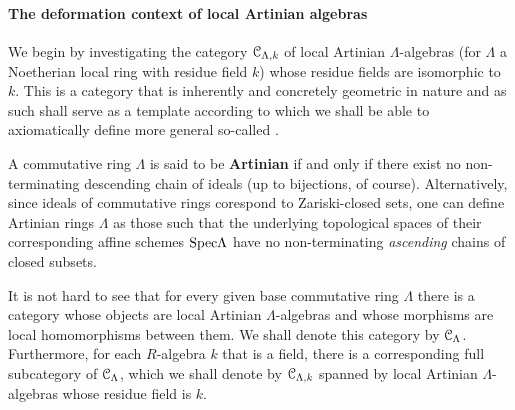             \paragraph{The deformation context of local Artinian algebras}
                We begin by investigating the category $\mathcal{C}_{\Lambda, k}$ of local Artinian $\Lambda$-algebras (for $\Lambda$ a Noetherian local ring with residue field $k$) whose residue fields are isomorphic to $k$. This is a category that is inherently and concretely geometric in nature and as such shall serve as a template according to which we shall be able to axiomatically define more general so-called .
                \begin{definition} \label{def: artinian_rings} 
                    A commutative ring $\Lambda$ is said to be \textbf{Artinian} if and only if there exist no non-terminating descending chain of ideals (up to bijections, of course). Alternatively, since ideals of commutative rings corespond to Zariski-closed sets, one can define Artinian rings $\Lambda$ as those such that the underlying topological spaces of their corresponding affine schemes $\mathrm{Spec} \Lambda$ have no non-terminating \textit{ascending} chains of closed subsets. 
                    
                    It is not hard to see that for every given base commutative ring $\Lambda$ there is a category whose objects are local Artinian $\Lambda$-algebras and whose morphisms are local homomorphisms between them. We shall denote this category by $\mathcal{C}_{\Lambda}$. Furthermore, for each $R$-algebra $k$ that is a field, there is a corresponding full subcategory of $\mathcal{C}_{\Lambda}$, which we shall denote by $\mathcal{C}_{\Lambda, k}$ spanned by local Artinian $\Lambda$-algebras whose residue field is $k$. 
                \end{definition}
                

